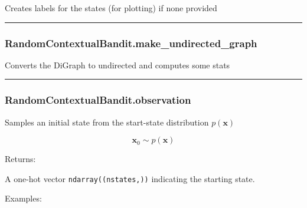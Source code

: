 \begin{Shaded}
\begin{Highlighting}[]
\NormalTok{)}
\end{Highlighting}
\end{Shaded}

Creates labels for the states (for plotting) if none provided

\begin{center}\rule{0.5\linewidth}{\linethickness}\end{center}

\subsubsection{RandomContextualBandit.make\_undirected\_graph}\label{randomcontextualbandit.make_undirected_graph}

\begin{Shaded}
\begin{Highlighting}[]
\NormalTok{)}
\end{Highlighting}
\end{Shaded}

Converts the DiGraph to undirected and computes some stats

\begin{center}\rule{0.5\linewidth}{\linethickness}\end{center}

\subsubsection{RandomContextualBandit.observation}\label{randomcontextualbandit.observation}

\begin{Shaded}
\begin{Highlighting}[]
\NormalTok{)}
\end{Highlighting}
\end{Shaded}

Samples an initial state from the start-state distribution
\(p(\mathbf x)\)

\[
\mathbf x_0 \sim p(\mathbf x)
\]

Returns:

A one-hot vector \texttt{ndarray((nstates,))} indicating the starting
state.

Examples:


